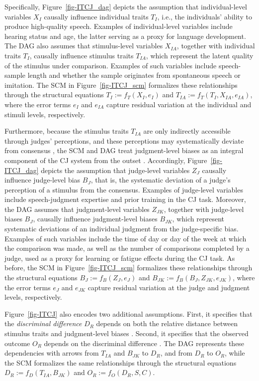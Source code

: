 \documentclass[
  authoryear,
  review,
  1p]{elsarticle}
\begin{document}
Specifically, Figure~\ref{fig-ITCJ_dag} depicts the assumption that
individual-level variables \(X_{I}\) causally influence individual
traits \(T_{I}\), i.e., the individuals' ability to produce high-quality
speech. Examples of individual-level variables include hearing status
and age, the latter serving as a proxy for language development. The DAG
also assumes that stimulus-level variables \(X_{IA}\), together with
individual traits \(T_{I}\), causally influence stimulus traits
\(T_{IA}\), which represent the latent quality of the stimulus under
comparison. Examples of such variables include speech-sample length and
whether the sample originates from spontaneous speech or imitation. The
SCM in Figure~\ref{fig-ITCJ_scm} formalizes these relationships through
the structural equations \(T_{I} := f_{T}(X_{I}, e_{I})\) and
\(T_{IA} := f_{T}(T_{I}, X_{IA}, e_{IA})\), where the error terms
\(e_{I}\) and \(e_{IA}\) capture residual variation at the individual
and stimuli levels, respectively.

Furthermore, because the stimulus traits \(T_{IA}\) are only indirectly
accessible through judges' perceptions, and these perceptions may
systematically deviate from consensus
\citep[see,][]{Pollitt_et_al_2003, vanDaal_et_al_2016}, the SCM and DAG
treat judgment-level biases as an integral component of the CJ system
from the outset \citep{Rivera_et_al_2025}. Accordingly,
Figure~\ref{fig-ITCJ_dag} depicts the assumption that judge-level
variables \(Z_{J}\) causally influence judge-level bias \(B_{J}\), that
is, the systematic deviation of a judge's perception of a stimulus from
the consensus. Examples of judge-level variables include speech-judgment
expertise and prior training in the CJ task. Moreover, the DAG assumes
that judgment-level variables \(Z_{JK}\), together with judge-level
biases \(B_{J}\), causally influence judgment-level biases \(B_{JK}\),
which represent systematic deviations of an individual judgment from the
judge-specific bias. Examples of such variables include the time of day
or day of the week at which the comparison was made, as well as the
number of comparisons completed by a judge, used as a proxy for learning
or fatigue effects during the CJ task. As before, the SCM in
Figure~\ref{fig-ITCJ_scm} formalizes these relationships through the
structural equations \(B_{J} := f_{B}(Z_{J}, e_{J})\) and
\(B_{JK} := f_{B}(B_{J}, Z_{JK}, e_{JK})\), where the error terms
\(e_{J}\) and \(e_{JK}\) capture residual variation at the judge and
judgment levels, respectively.

Figure~\ref{fig-ITCJ} also encodes two additional assumptions. First, it
specifies that the \emph{discriminal difference} \(D_{R}\) depends on
both the relative distance between stimulus traits and judgment-level
biases \citep{Rivera_et_al_2025}. Second, it specifies that the observed
outcome \(O_{R}\) depends on the discriminal difference
\citep{Thurstone_1927a, Thurstone_1927b}. The DAG represents these
dependencies with arrows from \(T_{IA}\) and \(B_{JK}\) to \(D_{R}\),
and from \(D_{R}\) to \(O_{R}\), while the SCM formalizes the same
relationships through the structural equations
\(D_{R} := f_{D}(T_{IA}, B_{JK})\) and \(O_{R} := f_{O}(D_{R}, S, C)\).
\end{document}
